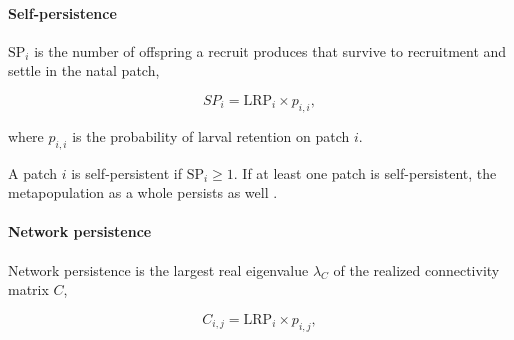 \documentclass[12pt, oneside]{article}   	%
\begin{document}
\paragraph*{Self-persistence} 

$\text{SP}_i$ is the number of offspring a recruit produces that survive to recruitment and settle in the natal patch,

\begin{equation}
SP_i = \text{LRP}_i \times p_{i,i}, \label{EQN_SP}  %
\end{equation}

where $p_{i,i}$ is the probability of larval retention on patch $i$.

A patch $i$ is self-persistent if $\text{SP}_i \geq 1$. If at least one patch is self-persistent, the metapopulation as a whole persists as well \citep{hastings_persistence_2006, burgess2014beyond}. 


\paragraph*{Network persistence}

Network persistence is the largest real eigenvalue $\lambda_C$ of the realized connectivity matrix $C$,

\begin{equation}
C_{i,j} = \text{LRP}_i \times p_{i,j}, \label{EQN_Connectivity_matrix}
\end{equation} 
\end{document}
